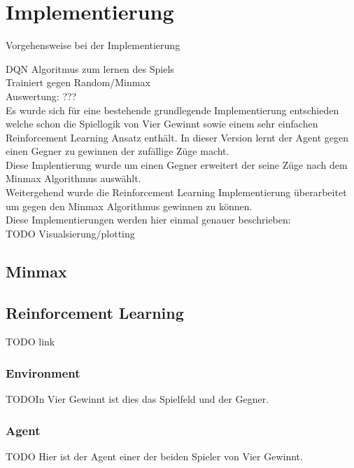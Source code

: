 \chapter{Implementierung}%

\label{cha:Implementierung}

Vorgehensweise bei der Implementierung

\colorbox{red!30}{DQN Algoritmus zum lernen des Spiels}\\

\colorbox{red!30}{Trainiert gegen Random/Minmax}\\

\colorbox{red!30}{Auswertung: ???}\\


Es wurde sich für eine bestehende grundlegende Implementierung entschieden welche schon die Spiellogik von Vier Gewinnt sowie einem sehr einfachen Reinforcement Learning Ansatz enthält. In dieser Version lernt der Agent gegen einen Gegner zu gewinnen der zufällige Züge macht.\\
Diese Implentierung wurde um einen Gegner erweitert der seine Züge nach dem Minmax Algorithmus auswählt.\\
Weitergehend wurde die Reinforcement Learning Implementierung überarbeitet um gegen den Minmax Algorithmus gewinnen zu können.\\
Diese Implementierungen werden hier einmal genauer beschrieben:\\
\colorbox{red!30}{TODO Visualsierung/plotting}

\section{Minmax}

\section{Reinforcement Learning}
\colorbox{red!30}{TODO link}

\subsection{Environment}
\colorbox{red!30}{TODO}In Vier Gewinnt ist dies das Spielfeld und der Gegner. 

\subsection{Agent}
\colorbox{red!30}{TODO} Hier ist der Agent einer der beiden Spieler von Vier Gewinnt.

